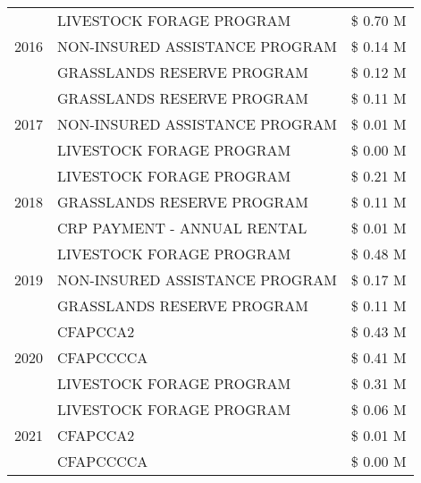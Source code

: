 \begin{tabular}{llr}
\multirow[t]{3}{*}{2016} & LIVESTOCK FORAGE PROGRAM & \$ 0.70 M \\
 & NON-INSURED ASSISTANCE PROGRAM & \$ 0.14 M \\
 & GRASSLANDS RESERVE PROGRAM & \$ 0.12 M \\
\cline{1-3}
\multirow[t]{3}{*}{2017} & GRASSLANDS RESERVE PROGRAM & \$ 0.11 M \\
 & NON-INSURED ASSISTANCE PROGRAM & \$ 0.01 M \\
 & LIVESTOCK FORAGE PROGRAM & \$ 0.00 M \\
\cline{1-3}
\multirow[t]{3}{*}{2018} & LIVESTOCK FORAGE PROGRAM & \$ 0.21 M \\
 & GRASSLANDS RESERVE PROGRAM & \$ 0.11 M \\
 & CRP PAYMENT - ANNUAL RENTAL & \$ 0.01 M \\
\cline{1-3}
\multirow[t]{3}{*}{2019} & LIVESTOCK FORAGE PROGRAM & \$ 0.48 M \\
 & NON-INSURED ASSISTANCE PROGRAM & \$ 0.17 M \\
 & GRASSLANDS RESERVE PROGRAM & \$ 0.11 M \\
\cline{1-3}
\multirow[t]{3}{*}{2020} & CFAPCCA2 & \$ 0.43 M \\
 & CFAPCCCCA & \$ 0.41 M \\
 & LIVESTOCK FORAGE PROGRAM & \$ 0.31 M \\
\cline{1-3}
\multirow[t]{3}{*}{2021} & LIVESTOCK FORAGE PROGRAM & \$ 0.06 M \\
 & CFAPCCA2 & \$ 0.01 M \\
 & CFAPCCCCA & \$ 0.00 M \\
\cline{1-3}
\bottomrule
\end{tabular}
